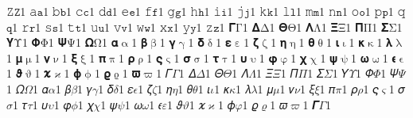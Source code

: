{𝚉}{{\(\mathtt{Z}\)}}1 {𝚊}{{\(\mathtt{a}\)}}1 {𝚋}{{\(\mathtt{b}\)}}1 {𝚌}{{\(\mathtt{c}\)}}1 {𝚍}{{\(\mathtt{d}\)}}1 {𝚎}{{\(\mathtt{e}\)}}1 {𝚏}{{\(\mathtt{f}\)}}1 {𝚐}{{\(\mathtt{g}\)}}1 {𝚑}{{\(\mathtt{h}\)}}1 {𝚒}{{\(\mathtt{i}\)}}1 {𝚓}{{\(\mathtt{j}\)}}1 {𝚔}{{\(\mathtt{k}\)}}1 {𝚕}{{\(\mathtt{l}\)}}1 {𝚖}{{\(\mathtt{m}\)}}1 {𝚗}{{\(\mathtt{n}\)}}1 {𝚘}{{\(\mathtt{o}\)}}1 {𝚙}{{\(\mathtt{p}\)}}1 {𝚚}{{\(\mathtt{q}\)}}1 {𝚛}{{\(\mathtt{r}\)}}1 {𝚜}{{\(\mathtt{s}\)}}1 {𝚝}{{\(\mathtt{t}\)}}1 {𝚞}{{\(\mathtt{u}\)}}1 {𝚟}{{\(\mathtt{v}\)}}1 {𝚠}{{\(\mathtt{w}\)}}1 {𝚡}{{\(\mathtt{x}\)}}1 {𝚢}{{\(\mathtt{y}\)}}1 {𝚣}{{\(\mathtt{z}\)}}1 {𝚪}{{\(\bm{{\mathrm{\Gamma}}}\)}}1 {𝚫}{{\(\bm{{\mathrm{\Delta}}}\)}}1 {𝚯}{{\(\bm{{\mathrm{\Theta}}}\)}}1 {𝚲}{{\(\bm{{\mathrm{\Lambda}}}\)}}1 {𝚵}{{\(\bm{{\mathrm{\Xi}}}\)}}1 {𝚷}{{\(\bm{{\mathrm{\Pi}}}\)}}1 {𝚺}{{\(\bm{{\mathrm{\Sigma}}}\)}}1 {𝚼}{{\(\bm{{\mathrm{\Upsilon}}}\)}}1 {𝚽}{{\(\bm{{\mathrm{\Phi}}}\)}}1 {𝚿}{{\(\bm{{\mathrm{\Psi}}}\)}}1 {𝛀}{{\(\bm{{\mathrm{\Omega}}}\)}}1 {𝛂}{{\(\bm{{\mathrm{\upalpha}}}\)}}1 {𝛃}{{\(\bm{{\mathrm{\upbeta}}}\)}}1 {𝛄}{{\(\bm{{\mathrm{\upgamma}}}\)}}1 {𝛅}{{\(\bm{{\mathrm{\updelta}}}\)}}1 {𝛆}{{\(\bm{{\mathrm{\upepsilon}}}\)}}1 {𝛇}{{\(\bm{{\mathrm{\upzeta}}}\)}}1 {𝛈}{{\(\bm{{\mathrm{\upeta}}}\)}}1 {𝛉}{{\(\bm{{\mathrm{\uptheta}}}\)}}1 {𝛊}{{\(\bm{{\mathrm{\upiota}}}\)}}1 {𝛋}{{\(\bm{{\mathrm{\upkappa}}}\)}}1 {𝛌}{{\(\bm{{\mathrm{\uplambda}}}\)}}1 {𝛍}{{\(\bm{{\mathrm{\upmu}}}\)}}1 {𝛎}{{\(\bm{{\mathrm{\upnu}}}\)}}1 {𝛏}{{\(\bm{{\mathrm{\upxi}}}\)}}1 {𝛑}{{\(\bm{{\mathrm{\uppi}}}\)}}1 {𝛒}{{\(\bm{{\mathrm{\uprho}}}\)}}1 {𝛓}{{\(\bm{{\mathrm{\upvarsigma}}}\)}}1 {𝛔}{{\(\bm{{\mathrm{\upsigma}}}\)}}1 {𝛕}{{\(\bm{{\mathrm{\uptau}}}\)}}1 {𝛖}{{\(\bm{{\mathrm{\upupsilon}}}\)}}1 {𝛗}{{\(\bm{{\mathrm{\upvarphi}}}\)}}1 {𝛘}{{\(\bm{{\mathrm{\upchi}}}\)}}1 {𝛙}{{\(\bm{{\mathrm{\uppsi}}}\)}}1 {𝛚}{{\(\bm{{\mathrm{\upomega}}}\)}}1 {𝛜}{{\(\bm{{\mathrm{\upvarepsilon}}}\)}}1 {𝛝}{{\(\bm{{\mathrm{\upvartheta}}}\)}}1 {𝛞}{{\(\bm{{\mathrm{\varkappa}}}\)}}1 {𝛟}{{\(\bm{{\mathrm{\upphi}}}\)}}1 {𝛠}{{\(\bm{{\mathrm{\upvarrho}}}\)}}1 {𝛡}{{\(\bm{{\mathrm{\upvarpi}}}\)}}1 {𝛤}{{\(\mathit{\varGamma}\)}}1 {𝛥}{{\(\mathit{\varDelta}\)}}1 {𝛩}{{\(\mathit{\varTheta}\)}}1 {𝛬}{{\(\mathit{\varLambda}\)}}1 {𝛯}{{\(\mathit{\varXi}\)}}1 {𝛱}{{\(\mathit{\varPi}\)}}1 {𝛴}{{\(\mathit{\varSigma}\)}}1 {𝛶}{{\(\mathit{\varUpsilon}\)}}1 {𝛷}{{\(\mathit{\varPhi}\)}}1 {𝛹}{{\(\mathit{\varPsi}\)}}1 {𝛺}{{\(\mathit{\varOmega}\)}}1 {𝛼}{{\(\mathit{\alpha}\)}}1 {𝛽}{{\(\mathit{\beta}\)}}1 {𝛾}{{\(\mathit{\gamma}\)}}1 {𝛿}{{\(\mathit{\delta}\)}}1 {𝜀}{{\(\mathit{\epsilon}\)}}1 {𝜁}{{\(\mathit{\zeta}\)}}1 {𝜂}{{\(\mathit{\eta}\)}}1 {𝜃}{{\(\mathit{\theta}\)}}1 {𝜄}{{\(\mathit{\iota}\)}}1 {𝜅}{{\(\mathit{\kappa}\)}}1 {𝜆}{{\(\mathit{\lambda}\)}}1 {𝜇}{{\(\mathit{\mu}\)}}1 {𝜈}{{\(\mathit{\nu}\)}}1 {𝜉}{{\(\mathit{\xi}\)}}1 {𝜋}{{\(\mathit{\pi}\)}}1 {𝜌}{{\(\mathit{\rho}\)}}1 {𝜍}{{\(\mathit{\varsigma}\)}}1 {𝜎}{{\(\mathit{\sigma}\)}}1 {𝜏}{{\(\mathit{\tau}\)}}1 {𝜐}{{\(\mathit{\upsilon}\)}}1 {𝜑}{{\(\mathit{\phi}\)}}1 {𝜒}{{\(\mathit{\chi}\)}}1 {𝜓}{{\(\mathit{\psi}\)}}1 {𝜔}{{\(\mathit{\omega}\)}}1 {𝜖}{{\(\mathit{\varepsilon}\)}}1 {𝜗}{{\(\mathit{\vartheta}\)}}1 {𝜘}{{\(\mathit{\varkappa}\)}}1 {𝜙}{{\(\mathit{\varphi}\)}}1 {𝜚}{{\(\mathit{\varrho}\)}}1 {𝜛}{{\(\mathit{\varpi}\)}}1 {𝜞}{{\(\bm{{\mathit{\varGamma}}}\)}}1 